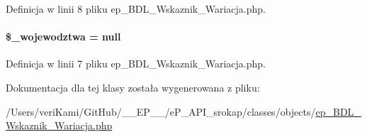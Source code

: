 Definicja w linii 8 pliku ep\-\_\-\-B\-D\-L\-\_\-\-Wskaznik\-\_\-\-Wariacja.\-php.

\hypertarget{classep___b_d_l___wskaznik___wariacja_a6e1a526b14484684c050725e04fc6185}{
\paragraph[{\$\-\_\-wojewodztwa}]{\setlength{\rightskip}{0pt plus 5cm}\$\-\_\-wojewodztwa = null}}\label{classep___b_d_l___wskaznik___wariacja_a6e1a526b14484684c050725e04fc6185}


Definicja w linii 7 pliku ep\-\_\-\-B\-D\-L\-\_\-\-Wskaznik\-\_\-\-Wariacja.\-php.



Dokumentacja dla tej klasy została wygenerowana z pliku\-:\begin{DoxyCompactItemize}
\item 
/\-Users/veri\-Kami/\-Git\-Hub/\-\_\-\-\_\-\-E\-P\-\_\-\-\_\-/e\-P\-\_\-\-A\-P\-I\-\_\-srokap/classes/objects/\hyperlink{ep___b_d_l___wskaznik___wariacja_8php}{ep\-\_\-\-B\-D\-L\-\_\-\-Wskaznik\-\_\-\-Wariacja.\-php}\end{DoxyCompactItemize}

